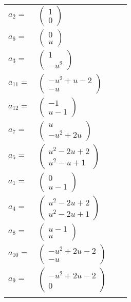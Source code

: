 \documentclass[1p]{elsarticle_modified}
\theoremstyle{definition}
\begin{document}
\begin{tabular}{m{7pt} m{180pt} m{7pt} m{180pt} }
\flushright $a_{2}=$&$\begin{pmatrix}1\\0\end{pmatrix}$ \\
\flushright $a_{6}=$&$\begin{pmatrix}0\\u\end{pmatrix}$ \\
\flushright $a_{3}=$&$\begin{pmatrix}1\\- u^2\end{pmatrix}$ \\
\flushright $a_{11}=$&$\begin{pmatrix}- u^2+u-2\\- u\end{pmatrix}$ \\
\flushright $a_{12}=$&$\begin{pmatrix}-1\\u-1\end{pmatrix}$ \\
\flushright $a_{7}=$&$\begin{pmatrix}u\\- u^2+2 u\end{pmatrix}$ \\
\flushright $a_{5}=$&$\begin{pmatrix}u^2-2 u+2\\u^2- u+1\end{pmatrix}$ \\
\flushright $a_{1}=$&$\begin{pmatrix}0\\u-1\end{pmatrix}$ \\
\flushright $a_{4}=$&$\begin{pmatrix}u^2-2 u+2\\u^2-2 u+1\end{pmatrix}$ \\
\flushright $a_{8}=$&$\begin{pmatrix}u-1\\u\end{pmatrix}$ \\
\flushright $a_{10}=$&$\begin{pmatrix}- u^2+2 u-2\\- u\end{pmatrix}$ \\
\flushright $a_{9}=$&$\begin{pmatrix}- u^2+2 u-2\\0\end{pmatrix}$\\&\end{tabular}
\end{document}

